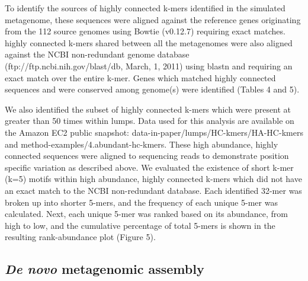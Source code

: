 \documentclass[10pt]{article}
\begin{document}
To identify the sources of highly connected k-mers identified in the
simulated metagenome, these sequences were aligned against the
reference genes originating from the 112 source genomes using Bowtie
(v0.12.7) requiring exact matches.  highly connected k-mers shared
between all the metagenomes were also aligned against the NCBI
non-redundant genome database (ftp://ftp.ncbi.nih.gov/blast/db, March,
1, 2011) using blastn \cite{Altschul:1990p1335} and requiring an exact
match over the entire k-mer.  Genes which matched highly connected
sequences and were conserved among genome(s) were identified (Tables 4
and 5).

We also identified the subset of highly connected k-mers which were
present at greater than 50 times within lumps. Data used for this
analysis are available on the Amazon EC2 public snapshot:
data-in-paper/lumps/HC-kmers/HA-HC-kmers and
method-examples/4.abundant-hc-kmers. These high abundance, highly
connected sequences were aligned to sequencing reads to demonstrate
position specific variation as described above.  We evaluated the
existence of short k-mer (k=5) motifs within high abundance, highly
connected k-mers which did not have an exact match to the NCBI
non-redundant database.  Each identified 32-mer was broken up into
shorter 5-mers, and the frequency of each unique 5-mer was calculated.
Next, each unique 5-mer was ranked based on its abundance, from high
to low, and the cumulative percentage of total 5-mers is shown in the
resulting rank-abundance plot (Figure 5).
  
\subsection*{\emph{De novo} metagenomic assembly}
\end{document}
